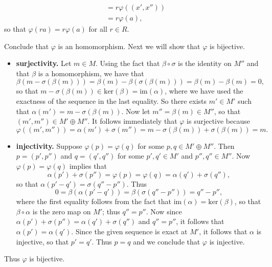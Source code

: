 \documentclass[9pt]{article}
\begin{document}
\begin{enumerate}
\begin{itemize}
\begin{align*}
                     &= r\varphi((x', x'')) \\
                     &= r\varphi(a),
               \end{align*}
               so that $\varphi(ra) = r\varphi(a)$ for all $r \in R$.
      \end{itemize}
      Conclude that $\varphi$ is an homomorphism. Next we will show that
      $\varphi$ is bijective.
      \begin{itemize}
         \item \textbf{surjectivity.} Let $m \in M$. Using the fact that
               $\beta\circ\sigma$ is the identity on $M''$ and that $\beta$ is a
               homomorphism, we have that
               $$\beta(m - \sigma(\beta(m))) =
                 \beta(m) - \beta(\sigma(\beta(m))) = \beta(m) - \beta(m) = 0,$$
               so that $m - \sigma(\beta(m)) \in\text{ker}(\beta)=
               \text{im}(\alpha)$, where we have used the exactness of the
               sequence in the last equality. So there exists $m' \in M'$ such
               that $\alpha(m') = m - \sigma(\beta(m))$. Now let
               $m'' = \beta(m) \in M''$, so that $(m', m'') \in M' \oplus M''$.
               It follows immediately that $\varphi$ is surjective because
               $$\varphi((m', m'')) = \alpha(m') + \sigma(m'') =
                 m - \sigma(\beta(m)) + \sigma(\beta(m)) = m.$$
         \item \textbf{injectivity.} Suppose $\varphi(p) = \varphi(q)$ for
               some $p, q \in M' \oplus M''$. Then $p = (p', p'')$ and
               $q = (q', q'')$ for some $p', q' \in M'$ and $p'', q'' \in M''$.
               Now
               $\varphi(p) = \varphi(q)$ implies that
               $$\alpha(p') + \sigma(p'') = \varphi(p) =
                 \varphi(q) = \alpha(q') + \sigma(q''),$$
               so that $\alpha(p' - q') = \sigma(q'' - p'')$. Thus
               $$0 = \beta(\alpha(p' - q')) =
                 \beta(\sigma(q'' - p'')) = q'' - p'',$$
               where the first equality follows from the fact that
               $\text{im}(\alpha) = \text{ker}(\beta)$, so that
               $\beta \circ \alpha$ is the zero map on $M'$; thus $q'' = p''$.
               Now since $\alpha(p') + \sigma(p'') = \alpha(q') + \sigma(q'')$
               and $q'' = p''$, it follows that $\alpha(p') = \alpha(q')$. Since
               the given sequence is exact at $M'$, it follows that $\alpha$ is
               injective, so that $p' = q'$. Thus $p = q$ and we conclude that
               $\varphi$ is injective.
      \end{itemize}
      Thus $\varphi$ is bijective.
\end{enumerate}
\end{document}
